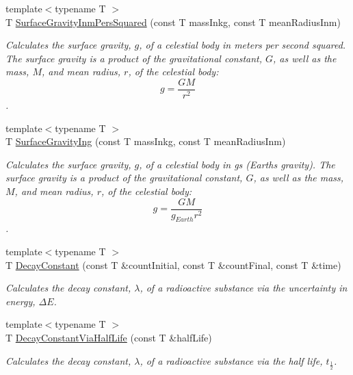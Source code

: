 \begin{DoxyCompactItemize}
{\footnotesize template$<$typename T $>$ }\\T \mbox{\hyperlink{group___e_g_x_phys-_astrophysics-_surface_gravity_gaf7e1f42b674fe8bb2211c40882a7d5b6}{Surface\+Gravity\+Inm\+Pers\+Squared}} (const T mass\+Inkg, const T mean\+Radius\+Inm)
\begin{DoxyCompactList}\small\item\em Calculates the surface gravity, $g$, of a celestial body in meters per second squared. The surface gravity is a product of the gravitational constant, $G$, as well as the mass, $M$, and mean radius, $r$, of the celestial body\+: \[g = \frac{GM}{r^2}\]. \end{DoxyCompactList}\item 
{\footnotesize template$<$typename T $>$ }\\T \mbox{\hyperlink{group___e_g_x_phys-_astrophysics-_surface_gravity_gab5bb479758d72608ef6ada063f6c1a1b}{Surface\+Gravity\+Ing}} (const T mass\+Inkg, const T mean\+Radius\+Inm)
\begin{DoxyCompactList}\small\item\em Calculates the surface gravity, $g$, of a celestial body in gs (Earth\textquotesingle{}s gravity). The surface gravity is a product of the gravitational constant, $G$, as well as the mass, $M$, and mean radius, $r$, of the celestial body\+: \[g = \frac{GM}{g_{Earth}r^2}\]. \end{DoxyCompactList}\item 
{\footnotesize template$<$typename T $>$ }\\T \mbox{\hyperlink{group___e_g_x_phys-_decay_constant_ga904edce5aad441b4a0873b3b1a83c7f2}{Decay\+Constant}} (const T \&count\+Initial, const T \&count\+Final, const T \&time)
\begin{DoxyCompactList}\small\item\em Calculates the decay constant, $\lambda$, of a radioactive substance via the uncertainty in energy, $\Delta E$. \end{DoxyCompactList}\item 
{\footnotesize template$<$typename T $>$ }\\T \mbox{\hyperlink{group___e_g_x_phys-_decay_constant_ga89c04a655d9e24f976399cc8f173b7aa}{Decay\+Constant\+Via\+Half\+Life}} (const T \&half\+Life)
\begin{DoxyCompactList}\small\item\em Calculates the decay constant, $\lambda$, of a radioactive substance via the half life, $t_{\frac{1}{2}}$. \end{DoxyCompactList}\item 

\end{DoxyCompactItemize}
